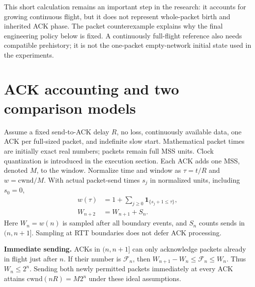 \documentclass[sigconf,nonacm]{acmart}
\newcommand{\cwnd}{\mathrm{cwnd}}
\newcommand{\ind}{\mathbf{1}}
\begin{document}
This short calculation remains an important step in the research: it
accounts for growing continuous flight, but it does not represent
whole-packet birth and inherited ACK phase. The packet counterexample
explains why the final engineering policy below is fixed. A continuously
full-flight reference also needs compatible prehistory; it is not the
one-packet empty-network initial state used in the experiments.

\section{ACK accounting and two comparison models}
Assume a fixed send-to-ACK delay $R$, no loss, continuously available data, one ACK per full-sized packet, and indefinite slow start. Mathematical packet times are initially exact real numbers; packets remain full MSS units. Clock quantization is introduced in the execution section. Each ACK adds one MSS, denoted $M$, to the window. Normalize time and window as $\tau=t/R$ and $w=\cwnd/M$. With actual packet-send times $s_j$ in normalized units, including $s_0=0$,
\begin{equation}
\begin{aligned}
 w(\tau)&=1+\sum_{j\ge0}\ind_{\{s_j+1\le\tau\}},\\
 W_{n+2}&=W_{n+1}+S_n.
\end{aligned}\label{eq:account}
\end{equation}
Here $W_n=w(n)$ is sampled after all boundary events, and $S_n$ counts sends in $(n,n+1]$. Sampling at RTT boundaries does not defer ACK processing.

\textbf{Immediate sending.} ACKs in $(n,n+1]$ can only acknowledge packets already in flight just after $n$. If their number is $\mathcal F_n$, then $W_{n+1}-W_n\le\mathcal F_n\le W_n$. Thus $W_n\le2^n$. Sending both newly permitted packets immediately at every ACK attains $\cwnd(nR)=M2^n$ under these ideal assumptions.
\end{document}
